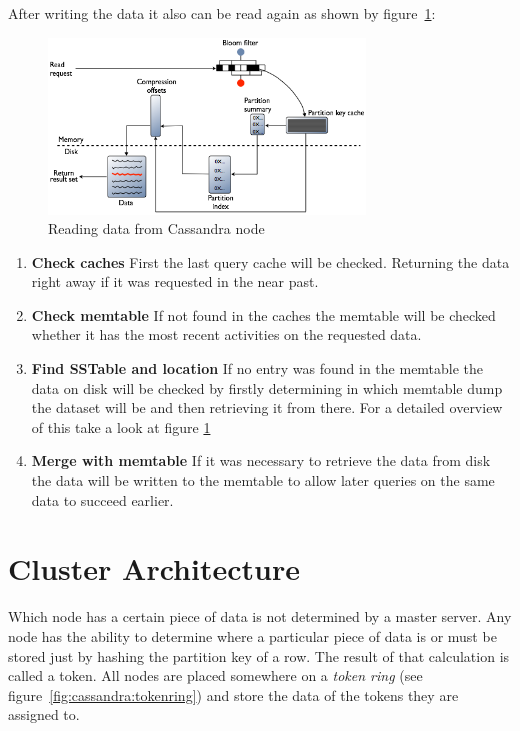 After writing the data it also can be read again as shown by figure~\ref{fig:cassandra:readData}:

\begin{figure}[ht]
    \centering
    \includegraphics[width=0.75\textwidth]{img/cassandra_local_read.png}
    \caption{Reading data from Cassandra node \autocite{datastaxReadData}}
    \label{fig:cassandra:readData}
\end{figure}
\begin{enumerate}
    \item \textbf{Check caches} First the last query cache will be checked. Returning the data right away if it was requested in the near past.
    \item \textbf{Check memtable} If not found in the caches the memtable will be checked whether it has the most recent activities on the requested data.
    \item \textbf{Find SSTable and location} If no entry was found in the memtable the data on disk will be checked by firstly determining in which memtable dump the dataset will be and then retrieving it from there. For a detailed overview of this take a look at figure \ref{fig:cassandra:readData}
    \item \textbf{Merge with memtable} If it was necessary to retrieve the data from disk the data will be written to the memtable to allow later queries on the same data to succeed earlier.
\end{enumerate}

\section{Cluster Architecture}\label{sec:CassandraClusterArchitecture}  %
Which node has a certain piece of data is not determined by a master server. Any node has the ability to determine where a particular piece of data is or must be stored just by hashing the partition key of a row. The result of that calculation is called a token. All nodes are placed somewhere on a \textit{token ring} (see figure~\ref{fig:cassandra:tokenring}) and store the data of the tokens they are assigned to.\autocite[2]{lakshman2010cassandra} \autocite[209,210]{DeCandia2007Dynamo}


